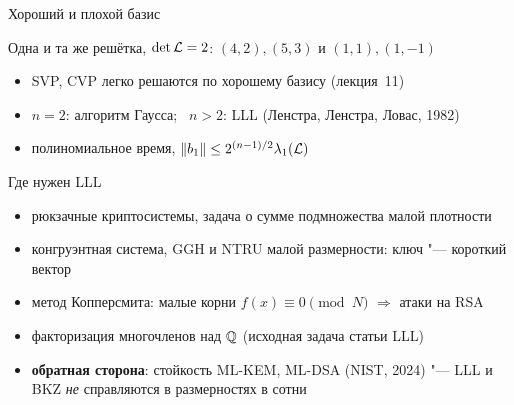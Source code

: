 \documentclass{ca-slides}
\author{}
\begin{document}
\titleframe

\begin{canvasframe}{Хороший и плохой базис}
  \centering
  \quad
  \par\medskip
  \raggedright
  Одна и та же решётка, $\det \mathcal{L} = 2$: \quad $(4, 2), (5, 3)$ \quad и \quad $(1, 1), (1, -1)$
  \begin{itemize}
    \item SVP, CVP легко решаются по хорошему базису (лекция~11)
    \item $n = 2$: алгоритм Гаусса; \ $n > 2$: \alert{LLL} (Ленстра, Ленстра, Ловас, 1982)
    \item полиномиальное время, $\|b_1\| \le 2^{(n-1)/2} \lambda_1(\mathcal{L})$
  \end{itemize}
\end{canvasframe}

\begin{canvasframe}{Где нужен LLL}
  \begin{itemize}
    \item рюкзачные криптосистемы, задача о сумме подмножества малой плотности
    \item конгруэнтная система, GGH и NTRU малой размерности: ключ "--- короткий вектор
    \item метод Копперсмита: малые корни $f(x) \equiv 0 \pmod N$ $\Rightarrow$ атаки на RSA
    \item факторизация многочленов над $\mathbb{Q}$ (исходная задача статьи LLL)
    \item \textbf{обратная сторона}: стойкость ML-KEM, ML-DSA (NIST, 2024) "---
      LLL и BKZ \emph{не} справляются в размерностях в сотни
  \end{itemize}
  \notearea[0.15\textheight]
\end{canvasframe}
\end{document}
